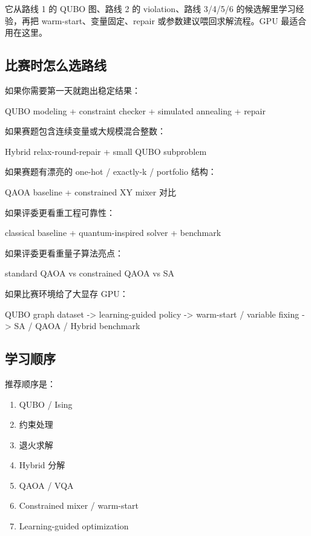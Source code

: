 \documentclass[UTF8,12pt,a4paper]{ctexart}
\begin{document}
它从路线 1 的 QUBO 图、路线 2 的 violation、路线 3/4/5/6 的候选解里学习经验，再把 warm-start、变量固定、repair 或参数建议喂回求解流程。GPU 最适合用在这里。

\subsection*{比赛时怎么选路线}

如果你需要第一天就跑出稳定结果：

\begin{GuideVerbatim}
QUBO modeling + constraint checker + simulated annealing + repair
\end{GuideVerbatim}

如果赛题包含连续变量或大规模混合整数：

\begin{GuideVerbatim}
Hybrid relax-round-repair + small QUBO subproblem
\end{GuideVerbatim}

如果赛题有漂亮的 one-hot / exactly-k / portfolio 结构：

\begin{GuideVerbatim}
QAOA baseline + constrained XY mixer 对比
\end{GuideVerbatim}

如果评委更看重工程可靠性：

\begin{GuideVerbatim}
classical baseline + quantum-inspired solver + benchmark
\end{GuideVerbatim}

如果评委更看重量子算法亮点：

\begin{GuideVerbatim}
standard QAOA vs constrained QAOA vs SA
\end{GuideVerbatim}

如果比赛环境给了大显存 GPU：

\begin{GuideVerbatim}
QUBO graph dataset -> learning-guided policy -> warm-start / variable fixing -> SA / QAOA / Hybrid benchmark
\end{GuideVerbatim}

\subsection*{学习顺序}

推荐顺序是：

\begin{enumerate}
\item QUBO / Ising
\item 约束处理
\item 退火求解
\item Hybrid 分解
\item QAOA / VQA
\item Constrained mixer / warm-start
\item Learning-guided optimization
\end{enumerate}
\end{document}
